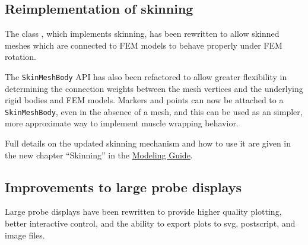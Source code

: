 \documentclass{article}
\begin{document}
\subsection*{Reimplementation of skinning}

The class , which
implements skinning, has been rewritten to allow skinned meshes which
are connected to FEM models to behave properly under FEM rotation.

The {\tt SkinMeshBody} API has also been refactored to allow greater
flexibility in determining the connection weights between the mesh
vertices and the underlying rigid bodies and FEM models. Markers and
points can now be attached to a {\tt SkinMeshBody}, even in the
absence of a mesh, and this can be used as an simpler, more
approximate way to implement muscle wrapping behavior.

Full details on the updated skinning mechanism and how to use it are
given in the new chapter ``Skinning'' in the
\href{http://www.artisynth.org/doc/info/modelguide/modelguide.html}
{Modeling Guide}.

\subsection*{Improvements to large probe displays}

Large probe displays have been rewritten to provide higher quality
plotting, better interactive control, and the ability to export plots
to svg, postscript, and image files.
\end{document}
